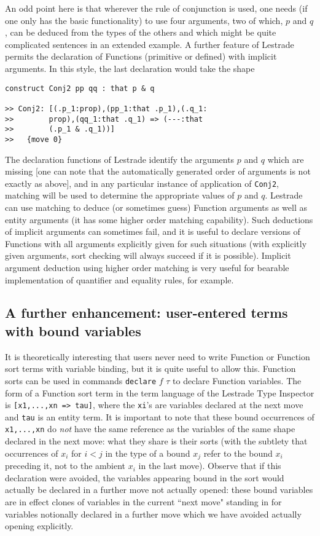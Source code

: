 \documentclass{article}
\begin{document}
An odd point here is that wherever the rule of conjunction is used, one needs (if one only has the basic functionality) to use four arguments, two of which,
$p$ and $q$, can be deduced from the types of the others and which might be quite complicated sentences in an extended example.  A further feature of Lestrade permits the declaration of Functions (primitive or defined) with implicit arguments.  In this style, the last declaration would take the shape

\begin{verbatim}
construct Conj2 pp qq : that p & q

>> Conj2: [(.p_1:prop),(pp_1:that .p_1),(.q_1:
>>        prop),(qq_1:that .q_1) => (---:that 
>>        (.p_1 & .q_1))]
>>   {move 0}
\end{verbatim}

The declaration functions of Lestrade identify the arguments $p$ and $q$ which are missing [one can note that the automatically generated order of arguments is not exactly as above], and in any particular instance of application of {\tt Conj2}, matching will be used to determine the appropriate values of $p$ and $q$.  Lestrade can use matching to deduce (or sometimes guess) Function arguments as well as entity arguments (it has some higher order matching capability).  Such deductions of implicit arguments can sometimes fail, and it is useful to declare versions of
Functions with all arguments explicitly given for such situations (with explicitly given arguments, sort checking will always succeed if it is possible).  Implicit argument deduction using higher order matching is very useful for bearable implementation of quantifier and equality rules, for example.

\subsection{A further enhancement:  user-entered terms with bound variables}

It is theoretically interesting that users never need to write Function or Function sort terms with variable binding, but it is quite useful to allow this.  Function sorts can be used in commands {\tt declare} $f$ $\tau$ to declare Function variables.  The form of a Function sort term in the term language of the Lestrade Type Inspector is {\tt [x1,...,xn => tau]}, where the {\tt xi}'s are variables declared at the next move and {\tt tau} is an entity term.  It is important to note that these bound occurrences of {\tt x1,...,xn} do {\em not\/} have the same reference as the variables of the same shape declared in the next move:  what they share is their sorts (with the subtlety that occurrences of $x_i$ for $i<j$ in the type of a bound $x_j$ refer to the bound $x_i$ preceding it, not to the ambient $x_i$ in the last move).  Observe that if this declaration were avoided, the variables appearing bound in the sort would actually be declared in a further move not actually opened:  these bound variables are in effect clones of variables in the current ``next move" standing in for variables notionally declared in a further move which we have avoided actually opening explicitly.
\end{document}
